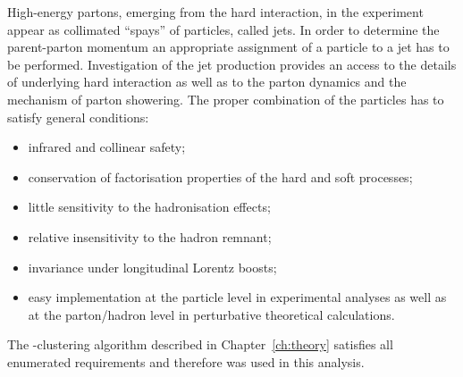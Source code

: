 High-energy partons, emerging from the hard interaction, in the experiment appear as collimated ``spays'' of particles, called jets. In order to determine the parent-parton momentum an appropriate assignment of a particle to a jet has to be performed. Investigation of the jet production provides an access to the details of underlying hard interaction as well as to the parton dynamics and the mechanism of parton showering. The proper combination of the particles has to satisfy general conditions:
\begin{itemize}
	\item infrared and collinear safety;
	\item conservation of factorisation properties of the hard and soft processes;
	\item little sensitivity to the hadronisation effects;
	\item relative insensitivity to the hadron remnant;
	\item invariance under longitudinal Lorentz boosts;
	\item easy implementation at the particle level in experimental analyses as well as at the parton/hadron level in perturbative theoretical calculations.
\end{itemize}
The \kt-clustering algorithm described in Chapter~\ref{ch:theory} satisfies all enumerated requirements and therefore was used in this analysis.